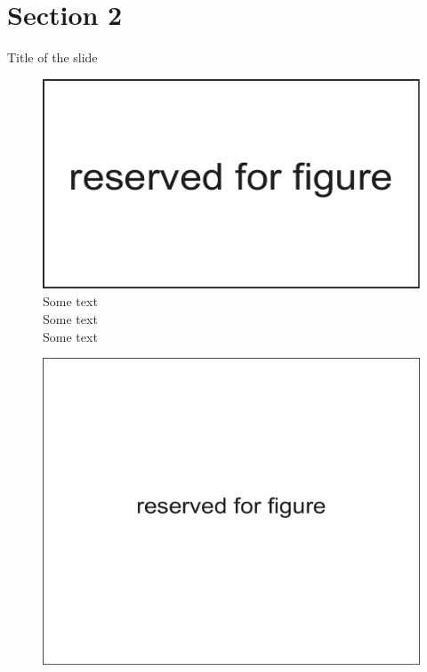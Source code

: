 \documentclass[russian,12pt,aspectratio=169,xcolor=table]{beamer}
\begin{document}
\section{Section 2}
\begin{frame}{Title of the slide}
	\begin{minipage}{.42\textwidth}
		\begin{figure}
			\centering
			\includegraphics[width=\textwidth]{img/4}\\
			\vspace{.8ex}
			Some text\\
			\vspace{.5ex}
			Some text\\
			\vspace{.5ex}
			Some text
		\end{figure}
	\end{minipage} \hfill
	\begin{minipage}{.57\textwidth}
		\begin{figure}
			\centering
			\includegraphics[width=\textwidth]{img/5}
		\end{figure}
	\end{minipage}
\end{frame}
\end{document}
